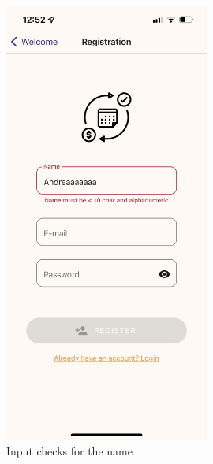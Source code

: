 \documentclass[12pt]{article}
\begin{document}
\begin{figure}[h!]
\begin{minipage}[c]{0.45\textwidth}
        \includegraphics[width=0.6\textwidth, clip]{../../assets/smartphone/regName.PNG}
        \caption{Input checks for the name}
        \label{fig:rname}
    \end{minipage}
\end{figure}
\end{document}

